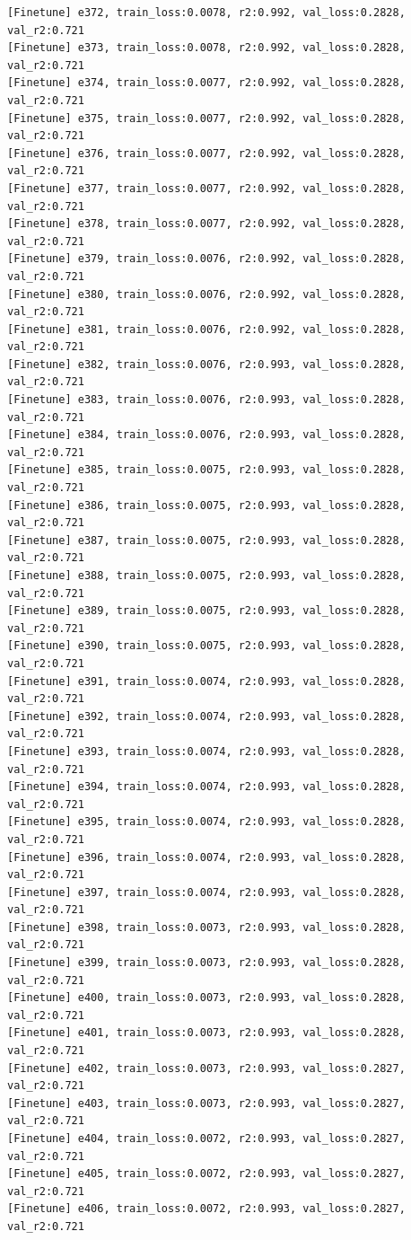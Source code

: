 \documentclass[a4paper, 12pt]{article}
\begin{document}
\begin{lstlisting}
[Finetune] e372, train_loss:0.0078, r2:0.992, val_loss:0.2828, val_r2:0.721
[Finetune] e373, train_loss:0.0078, r2:0.992, val_loss:0.2828, val_r2:0.721
[Finetune] e374, train_loss:0.0077, r2:0.992, val_loss:0.2828, val_r2:0.721
[Finetune] e375, train_loss:0.0077, r2:0.992, val_loss:0.2828, val_r2:0.721
[Finetune] e376, train_loss:0.0077, r2:0.992, val_loss:0.2828, val_r2:0.721
[Finetune] e377, train_loss:0.0077, r2:0.992, val_loss:0.2828, val_r2:0.721
[Finetune] e378, train_loss:0.0077, r2:0.992, val_loss:0.2828, val_r2:0.721
[Finetune] e379, train_loss:0.0076, r2:0.992, val_loss:0.2828, val_r2:0.721
[Finetune] e380, train_loss:0.0076, r2:0.992, val_loss:0.2828, val_r2:0.721
[Finetune] e381, train_loss:0.0076, r2:0.992, val_loss:0.2828, val_r2:0.721
[Finetune] e382, train_loss:0.0076, r2:0.993, val_loss:0.2828, val_r2:0.721
[Finetune] e383, train_loss:0.0076, r2:0.993, val_loss:0.2828, val_r2:0.721
[Finetune] e384, train_loss:0.0076, r2:0.993, val_loss:0.2828, val_r2:0.721
[Finetune] e385, train_loss:0.0075, r2:0.993, val_loss:0.2828, val_r2:0.721
[Finetune] e386, train_loss:0.0075, r2:0.993, val_loss:0.2828, val_r2:0.721
[Finetune] e387, train_loss:0.0075, r2:0.993, val_loss:0.2828, val_r2:0.721
[Finetune] e388, train_loss:0.0075, r2:0.993, val_loss:0.2828, val_r2:0.721
[Finetune] e389, train_loss:0.0075, r2:0.993, val_loss:0.2828, val_r2:0.721
[Finetune] e390, train_loss:0.0075, r2:0.993, val_loss:0.2828, val_r2:0.721
[Finetune] e391, train_loss:0.0074, r2:0.993, val_loss:0.2828, val_r2:0.721
[Finetune] e392, train_loss:0.0074, r2:0.993, val_loss:0.2828, val_r2:0.721
[Finetune] e393, train_loss:0.0074, r2:0.993, val_loss:0.2828, val_r2:0.721
[Finetune] e394, train_loss:0.0074, r2:0.993, val_loss:0.2828, val_r2:0.721
[Finetune] e395, train_loss:0.0074, r2:0.993, val_loss:0.2828, val_r2:0.721
[Finetune] e396, train_loss:0.0074, r2:0.993, val_loss:0.2828, val_r2:0.721
[Finetune] e397, train_loss:0.0074, r2:0.993, val_loss:0.2828, val_r2:0.721
[Finetune] e398, train_loss:0.0073, r2:0.993, val_loss:0.2828, val_r2:0.721
[Finetune] e399, train_loss:0.0073, r2:0.993, val_loss:0.2828, val_r2:0.721
[Finetune] e400, train_loss:0.0073, r2:0.993, val_loss:0.2828, val_r2:0.721
[Finetune] e401, train_loss:0.0073, r2:0.993, val_loss:0.2828, val_r2:0.721
[Finetune] e402, train_loss:0.0073, r2:0.993, val_loss:0.2827, val_r2:0.721
[Finetune] e403, train_loss:0.0073, r2:0.993, val_loss:0.2827, val_r2:0.721
[Finetune] e404, train_loss:0.0072, r2:0.993, val_loss:0.2827, val_r2:0.721
[Finetune] e405, train_loss:0.0072, r2:0.993, val_loss:0.2827, val_r2:0.721
[Finetune] e406, train_loss:0.0072, r2:0.993, val_loss:0.2827, val_r2:0.721

\end{lstlisting}
\end{document}
